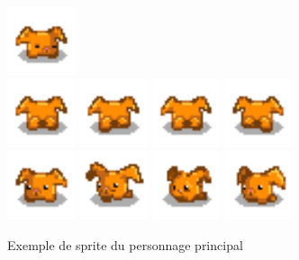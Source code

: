 \documentclass{article}
\begin{document}
\begin{figure}[h]
        \includegraphics[height = 2cm]{haricot/idle_3.png}
        \\
        \includegraphics[height = 2cm]{haricot/back_0.png}
        \includegraphics[height = 2cm]{haricot/back_1.png}
        \includegraphics[height = 2cm]{haricot/back_2.png}
        \includegraphics[height = 2cm]{haricot/back_3.png}
        \\
        \includegraphics[height = 2cm]{haricot/left_0.png}
        \includegraphics[height = 2cm]{haricot/left_1.png}
        \includegraphics[height = 2cm]{haricot/left_2.png}
        \includegraphics[height = 2cm]{haricot/left_3.png}
        \caption{Exemple de sprite du personnage principal}\label{lapin_devant}
    \end{figure}
\end{document}
